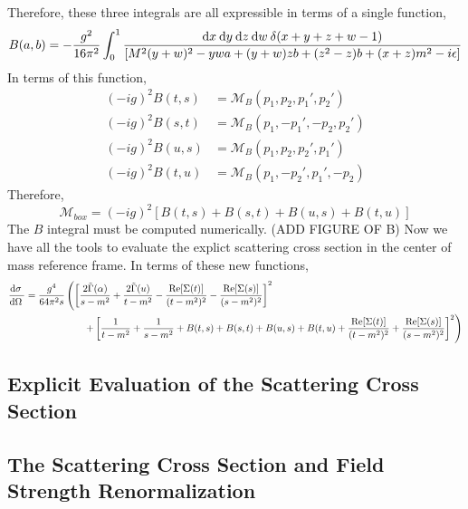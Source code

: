 \documentclass{article}
\begin{document}
Therefore, these three integrals are all expressible in terms of a single function,
\[ B(a,b) = -\frac{g^2}{16 \pi^2} \int_{0}^{1} \frac{\mathrm{d}x \: \mathrm{d}y \: \mathrm{d}z \: \mathrm{d}w \: \delta(x + y + z + w - 1) }{[M^2 (y + w)^2 - yw a + (y + w)z b + (z^2 - z) b + (x + z)m^2 - i \epsilon]} \]
In terms of this function,
\begin{align*}
(-ig)^2 B(t, s) &= \mathcal{M}_B(p_1, p_2, p_1', p_2') \\
(-ig)^2 B(s, t) &= \mathcal{M}_B(p_1, -p_1', -p_2, p_2') \\
(-ig)^2 B(u, s) &= \mathcal{M}_B(p_1, p_2, p_2', p_1') \\
(-ig)^2 B(t, u) &= \mathcal{M}_B(p_1, -p_2', p_1', -p_2) 
\end{align*}
Therefore, 
\[\mathcal{M}_{box} = (-ig)^2[B(t, s) + B(s, t) + B(u, s) + B(t, u)]\]
The $B$ integral must be computed numerically.
(ADD FIGURE OF B) 
Now we have all the tools to evaluate the explict scattering cross section in the center of mass reference frame. In terms of these new functions,
\begin{align*}
\frac{\mathrm{d}\sigma \:}{\mathrm{d}\Omega \:} 
&= \frac{g^4}{64 \pi^2 s} \left( \left[ \frac{2\tilde{\Gamma}(\alpha)}{s - m^2} + \frac{2\tilde{\Gamma}(u)}{t - m^2} - \frac{\mathrm{Re}[\Sigma(t)]}{(t - m^2)^2} - \frac{\mathrm{Re}[\Sigma(s)]}{(s - m^2)^2} \right]^2 \right.
\\ 
& \left.
\quad \quad \quad \quad \quad \quad 
+ \left[ \frac{1}{t - m^2} + \frac{1}{s - m^2} + B(t, s) + B(s, t) + B(u, s) + B(t, u) + \frac{\mathrm{Re}[\Sigma(t)]}{(t - m^2)^2} + \frac{\mathrm{Re}[\Sigma(s)]}{(s - m^2)^2} \right]^2 \right) 
\end{align*}

\subsection{Explicit Evaluation of the Scattering Cross Section}





\subsection{The Scattering Cross Section and Field Strength Renormalization}
\end{document}
